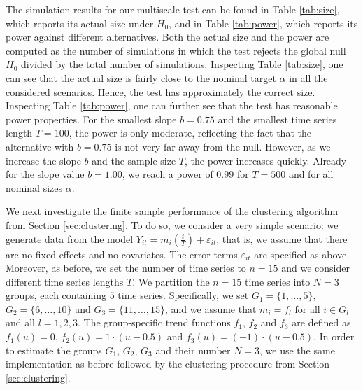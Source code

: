 \documentclass[12pt]{article}
\begin{document}
The simulation results for our multiscale test can be found in Table \ref{tab:size}, which reports its actual size under $H_0$, and in Table \ref{tab:power}, which reports its power against different alternatives. Both the actual size and the power are computed as the number of simulations in which the test rejects the global null $H_0$ divided by the total number of simulations.
Inspecting Table \ref{tab:size}, one can see that the actual size is fairly close to the nominal target $\alpha$ in all the considered scenarios. Hence, the test has approximately the correct size. 
Inspecting Table \ref{tab:power}, one can further see that the test has reasonable power properties. For the smallest slope $b=0.75$ and the smallest time series length $T=100$, the power is only moderate, reflecting the fact that the alternative with $b=0.75$ is not very far away from the null. However, as we increase the slope $b$ and the sample size $T$, the power increases quickly. Already for the slope value $b = 1.00$, we reach a power of $0.99$ for $T = 500$ and for all nominal sizes $\alpha$.


We next investigate the finite sample performance of the clustering algorithm from Section \ref{sec:clustering}. To do so, we consider a very simple scenario: we generate data from the model $Y_{it} = m_i(\frac{t}{T}) + \varepsilon_{it}$, that is, we assume that there are no fixed effects and no covariates. The error terms $\varepsilon_{it}$ are specified as above. Moreover, as before, we set the number of time series to $n = 15$ and we consider different time series lengths $T$. We partition the $n = 15$ time series into $N=3$ groups, each containing $5$ time series. Specifically, we set $G_1 = \{1,\ldots, 5\}$, $G_2 = \{6,\ldots, 10\}$ and $G_3 =  \{11,\ldots, 15\}$, and we assume that $m_i = f_l$ for all $i \in G_l$ and all $l = 1, 2, 3$. The group-specific trend functions $f_1$, $f_2$ and $f_3$ are defined as $f_1(u) = 0$, $f_2(u) = 1 \cdot (u - 0.5)$ and $f_3(u) =  (- 1) \cdot (u - 0.5)$. In order to estimate the groups $G_1$, $G_2$, $G_3$ and their number $N = 3$, we use the same implementation as before followed by the clustering procedure from Section \ref{sec:clustering}. 
\end{document}
